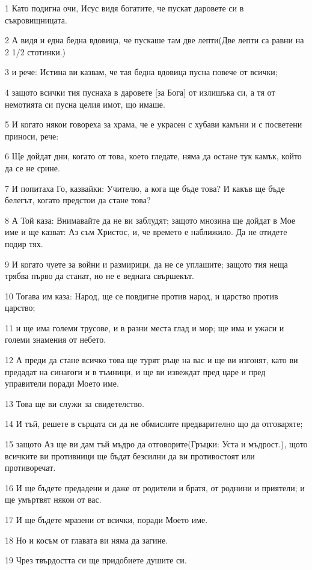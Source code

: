 \par 1 Като подигна очи, Исус видя богатите, че пускат даровете си в съкровищницата.
\par 2 А видя и една бедна вдовица, че пускаше там две лепти(Две лепти са равни на 2 1/2 стотинки.)
\par 3 и рече: Истина ви казвам, че тая бедна вдовица пусна повече от всички;
\par 4 защото всички тия пуснаха в даровете [за Бога] от излишъка си, а тя от немотията си пусна целия имот, що имаше.
\par 5 И когато някои говореха за храма, че е украсен с хубави камъни и с посветени приноси, рече:
\par 6 Ще дойдат дни, когато от това, което гледате, няма да остане тук камък, който да се не срине.
\par 7 И попитаха Го, казвайки: Учителю, а кога ще бъде това? И какъв ще бъде белегът, когато предстои да стане това?
\par 8 А Той каза: Внимавайте да не ви заблудят; защото мнозина ще дойдат в Мое име и ще казват: Аз съм Христос, и, че времето е наближило. Да не отидете подир тях.
\par 9 И когато чуете за войни и размирици, да не се уплашите; защото тия неща трябва първо да станат, но не е веднага свършекът.
\par 10 Тогава им каза: Народ, ще се повдигне против народ, и царство против царство;
\par 11 и ще има големи трусове, и в разни места глад и мор; ще има и ужаси и големи знамения от небето.
\par 12 А преди да стане всичко това ще турят ръце на вас и ще ви изгонят, като ви предадат на синагоги и в тъмници, и ще ви извеждат пред царе и пред управители поради Моето име.
\par 13 Това ще ви служи за свидетелство.
\par 14 И тъй, решете в сърцата си да не обмисляте предварително що да отговаряте;
\par 15 защото Аз ще ви дам тъй мъдро да отговорите(Гръцки: Уста и мъдрост.), щото всичките ви противници ще бъдат безсилни да ви противостоят или противоречат.
\par 16 И ще бъдете предадени и даже от родители и братя, от роднини и приятели; и ще умъртвят някои от вас.
\par 17 И ще бъдете мразени от всички, поради Моето име.
\par 18 Но и косъм от главата ви няма да загине.
\par 19 Чрез твърдостта си ще придобиете душите си.
